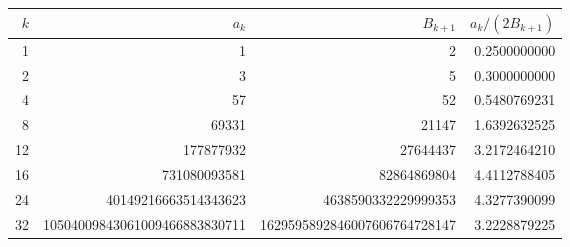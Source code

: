 \begin{tabular}{r r r r}
\toprule
$k$ & $a_k$ & $B_{k+1}$ & $a_k/(2B_{k+1})$ \\
\midrule
1 & 1 & 2 & 0.2500000000 \\
2 & 3 & 5 & 0.3000000000 \\
4 & 57 & 52 & 0.5480769231 \\
8 & 69331 & 21147 & 1.6392632525 \\
12 & 177877932 & 27644437 & 3.2172464210 \\
16 & 731080093581 & 82864869804 & 4.4112788405 \\
24 & 40149216663514343623 & 4638590332229999353 & 4.3277390099 \\
32 & 10504009843061009466883830711 & 1629595892846007606764728147 & 3.2228879225 \\
\bottomrule
\end{tabular}
